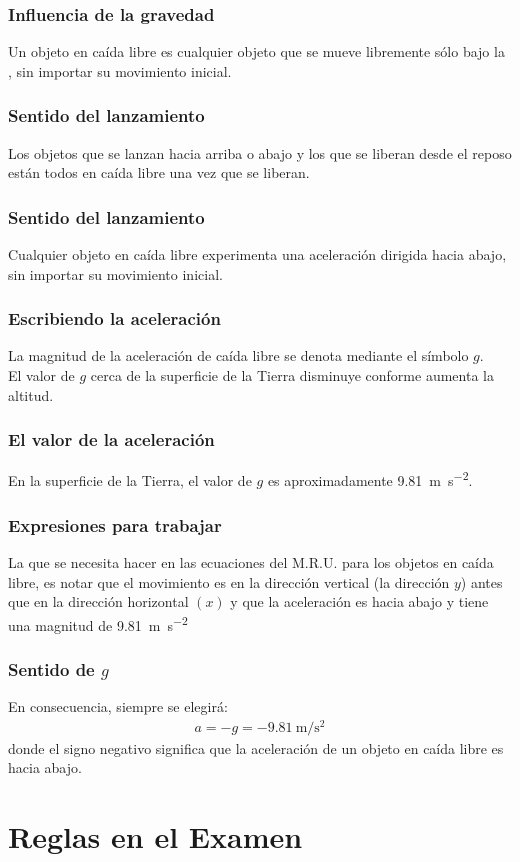 \documentclass[14pt]{beamer}
\begin{document}
\begin{frame}
\frametitle{Influencia de la gravedad}
Un objeto en caída libre es cualquier objeto que se mueve libremente sólo bajo la , \pause sin importar su movimiento inicial.
\end{frame}
\begin{frame}
\frametitle{Sentido del lanzamiento}
Los objetos que se lanzan hacia arriba o abajo y los que se liberan desde el reposo están todos en caída libre una vez que se liberan.
\end{frame}
\begin{frame}
\frametitle{Sentido del lanzamiento}
Cualquier objeto en caída libre experimenta una aceleración dirigida hacia abajo, sin importar su movimiento inicial.
\end{frame}
\begin{frame}
\frametitle{Escribiendo la aceleración}
La magnitud de la aceleración de caída libre se denota mediante el símbolo $g$.
\\
\bigskip
\pause
El valor de $g$ cerca de la superficie de la Tierra disminuye conforme aumenta la altitud.
\end{frame}
\begin{frame}
\frametitle{El valor de la aceleración}
En la superficie de la Tierra, el valor de $g$ es aproximadamente \SI{9.81}{\meter\per\square\second}.
\end{frame}
\begin{frame}
\frametitle{Expresiones para trabajar}
La  que se necesita hacer en las ecuaciones del M.R.U. para los objetos en caída libre,  es notar que el movimiento es en la dirección vertical (la dirección $y$) \pause antes que en la dirección horizontal $(x)$ \pause y que la aceleración es hacia abajo y tiene una magnitud de \SI{9.81}{\meter\per\square\second}
\end{frame}
\begin{frame}
\frametitle{Sentido de $g$}
En consecuencia, \pause siempre se elegirá:
\pause
\begin{align*}
a = - g = - \SI{9.81}{\meter\per\square\second}
\end{align*}
donde el signo negativo significa que la aceleración de un objeto en caída libre es hacia abajo.
\end{frame}

\section{Reglas en el Examen}
\end{document}
